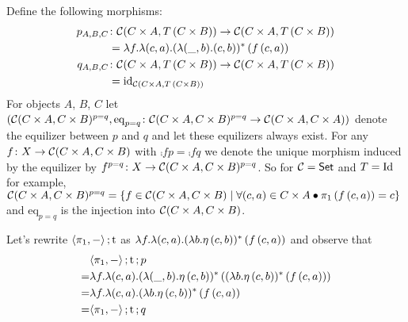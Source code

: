 \documentclass[runningheads,envcountsame]{llncs}
\begin{document}
Define the following morphisms:
\begin{align}
    p_{A,B,C} &\colon \homC{C \times A}{T\,(C \times B)} \to \homC{C \times A}{T\,(C \times B)} \\
               &= \lambda f. \lambda (c, a). (\lambda (\_, b). (c, b))^*\,(f\,(c, a)) \\
    q_{A,B,C} &\colon \homC{C \times A}{T\,(C \times B)} \to \homC{C \times A}{T\,(C \times B)} \\
              &= \id_{\homC{C \times A}{T\,(C \times B)}}
\end{align}
For objects $A$, $B$, $C$ let $(\mathcal{C}(C \times A, C \times B)^{p=q}, \mathrm{eq}_{p=q}\colon \mathcal{C}(C \times A, C \times B)^{p=q} \to \mathcal{C}(C \times A, C \times A))$ denote the equilizer between $p$ and $q$ and let these equilizers always exist. For any $f\colon X \to \mathcal{C}(C \times A, C \times B)$ with $\comp{f}{p} = \comp{f}{q}$ we denote the unique morphism induced by the equilizer by $f^{p=q}\colon X \to \mathcal{C}(C \times A, C \times B)^{p=q}$.
So for $\mathcal{C} = \mathsf{Set}$ and $T = \Id$ for example, $\mathcal{C}(C \times A, C \times B)^{p=q} = \{ f \in \mathcal{C}(C \times A, C \times B) \mid \forall (c, a) \in C \times A \bullet \pi_1\,(f\,(c, a)) = c \}$ and $\mathrm{eq}_{p=q}$ is the injection into $\mathcal{C}(C \times A, C \times B)$.

Let's rewrite $\comp{\langle \pi_1, - \rangle}{\mstrength}$ as $\lambda f. \lambda (c, a). (\lambda b. \munit\,(c, b))^*\,(f\,(c, a))$ and observe that 
\begin{align}
   & \comp{\comp{\langle \pi_1, - \rangle}{\mstrength}}{p} \\
 = & \lambda f. \lambda (c, a). (\lambda (\_, b). \munit\,(c, b))^*\,((\lambda b. \munit\,(c, b))^*\,(f\,(c, a))) \\
 = & \lambda f. \lambda (c, a). (\lambda b. \munit\,(c, b))^*\,(f\,(c, a)) \\
 = & \comp{\comp{\langle \pi_1, - \rangle}{\mstrength}}{q}
\end{align}
\end{document}

